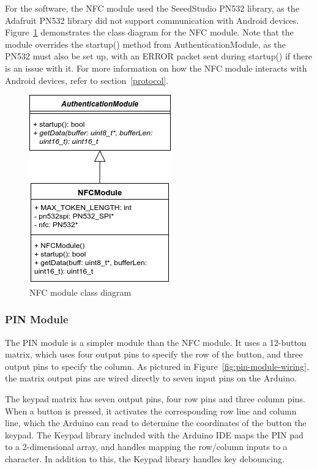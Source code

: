 \documentclass[12pt]{report}
\let\Oldsubsubsection\subsubsection
\renewcommand{\subsubsection}{\FloatBarrier\Oldsubsubsection}
\begin{document}
For the software, the NFC module used the SeeedStudio PN532 library, as the Adafruit PN532 library did not support 
communication with Android devices. Figure~\ref{fig:nfc-module-class} demonstrates the class diagram for the NFC 
module. Note that the module overrides the startup() method from AuthenticationModule, as the PN532 must also be set 
up, with an ERROR packet sent during startup() if there is an issue with it. For more information on how the NFC module 
interacts with Android devices, refer to section~\ref{protocol}.

\begin{figure}
    \centering
    \includegraphics{Diagrams/Hardware-Diagrams/nfc_module_class}
    \caption{NFC module class diagram}
    \label{fig:nfc-module-class}
\end{figure}

\subsubsection{PIN Module} \label{pin-modules}

The PIN module is a simpler module than the NFC module. It uses a 12-button matrix, which uses four output pins to 
specify the row of the button, and three output pins to specify the column. As pictured in 
Figure~\ref{fig:pin-module-wiring}, the matrix output pins are wired directly to seven input pins on the Arduino.

The keypad matrix has seven output pins, four row pins and three column pins. When a button is pressed, it activates 
the corresponding row line and column line, which the Arduino can read to determine the coordinates of the button the 
keypad. The Keypad library included with the Arduino IDE maps the PIN pad to a 2-dimensional array, and handles mapping 
the row/column inputs to a character. In addition to this, the Keypad library handles key debouncing.
\end{document}

